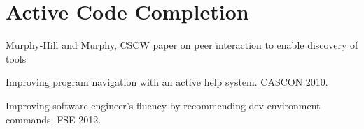 \section{Active Code Completion}\label{acc}
Murphy-Hill and Murphy, CSCW paper on peer interaction to enable discovery of tools

Improving program navigation with an active help system. CASCON 2010.

Improving software engineer's fluency by recommending dev environment commands. FSE 2012.

